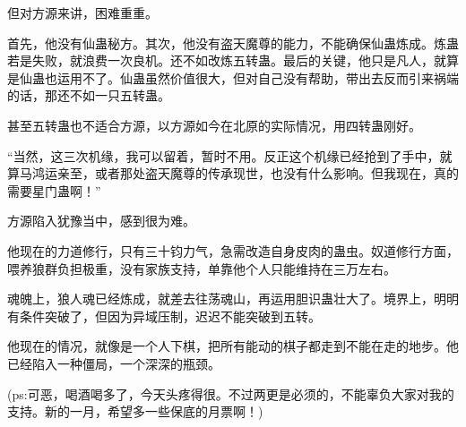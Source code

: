 \begin{this_body}
但对方源来讲，困难重重。

首先，他没有仙蛊秘方。其次，他没有盗天魔尊的能力，不能确保仙蛊炼成。炼蛊若是失败，就浪费一次良机。还不如改炼五转蛊。最后的关键，他只是凡人，就算是仙蛊也运用不了。仙蛊虽然价值很大，但对自己没有帮助，带出去反而引来祸端的话，那还不如一只五转蛊。

甚至五转蛊也不适合方源，以方源如今在北原的实际情况，用四转蛊刚好。

“当然，这三次机缘，我可以留着，暂时不用。反正这个机缘已经抢到了手中，就算马鸿运亲至，或者那处盗天魔尊的传承现世，也没有什么影响。但我现在，真的需要星门蛊啊！”

方源陷入犹豫当中，感到很为难。

他现在的力道修行，只有三十钧力气，急需改造自身皮肉的蛊虫。奴道修行方面，喂养狼群负担极重，没有家族支持，单靠他个人只能维持在三万左右。

魂魄上，狼人魂已经炼成，就差去往荡魂山，再运用胆识蛊壮大了。境界上，明明有条件突破了，但因为异域压制，迟迟不能突破到五转。

他现在的情况，就像是一个人下棋，把所有能动的棋子都走到不能在走的地步。他已经陷入一种僵局，一个深深的瓶颈。

(ps:可恶，喝酒喝多了，今天头疼得很。不过两更是必须的，不能辜负大家对我的支持。新的一月，希望多一些保底的月票啊！)

\end{this_body}

